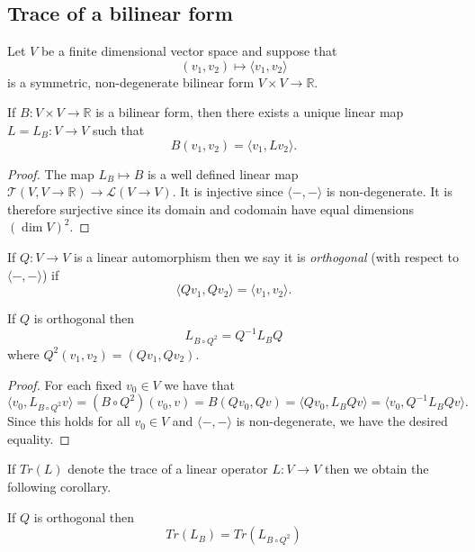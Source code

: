 \documentclass[twoside, a4paper, 10pt]{amsart}
\begin{document}
\subsection{Trace of a bilinear form}

Let $V$ be a finite dimensional vector space and suppose that $$ (v_1, v_2) \mapsto \langle v_1, v_2 \rangle $$ is a symmetric, non-degenerate bilinear form $V \times V \to \mathbb{R}.$ 

\begin{lemma} If $B: V \times V \to \mathbb{R}$ is a bilinear form, then there exists a unique linear map $L=L_B: V \to V$ such that $$B(v_1,v_2) = \langle v_1, Lv_2 \rangle.$$  \end{lemma} 

\begin{proof} The map $L_B \mapsto B$ is a well defined linear map $\mathcal{T}(V,V \to \mathbb{R}) \to \mathcal{L}(V \to V)$. It is injective since $\langle -, - \rangle$ is non-degenerate. It is therefore surjective since its domain and codomain have equal dimensions $(\dim V)^2$. \end{proof}

If $Q:V \to V$ is a linear automorphism then we say it is \textit{orthogonal} (with respect to $\langle -, - \rangle$) if $$\langle Qv_1, Qv_2 \rangle = \langle v_1, v_2 \rangle .$$

\begin{lemma} If $Q$ is orthogonal then $$L_{B \circ Q^2} = Q^{-1} L_B Q$$ where $Q^2(v_1,v_2)=(Qv_1, Qv_2).$  \end{lemma}

\begin{proof} For each fixed $v_0 \in V$ we have that $$\langle v_0, L_{B \circ Q^2} v \rangle = (B \circ Q^2) (v_0, v) = B(Qv_0, Qv) = \langle Qv_0, L_B Qv \rangle = \langle v_0, Q^{-1} L_B Q v \rangle .$$  Since this holds for all $v_0 \in V$ and $\langle -, - \rangle $ is non-degenerate, we have the desired equality. \end{proof}

If $Tr(L)$ denote the trace of a linear operator $L:V \to V$ then we obtain the following corollary.

\begin{corol} If $Q$ is orthogonal then $$Tr(L_B) = Tr(L_{B \circ Q^2})$$ \end{corol}
\end{document}
